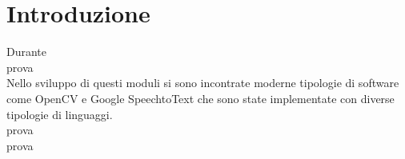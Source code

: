 \chapter*{Introduzione}

Durante
\\[1\baselineskip]
prova
\\[2\baselineskip]
Nello sviluppo di questi moduli si sono incontrate moderne tipologie di software
come OpenCV e Google SpeechtoText che sono state implementate con diverse
tipologie di linguaggi.
\\[2\baselineskip]
prova
\\[2\baselineskip]
prova

